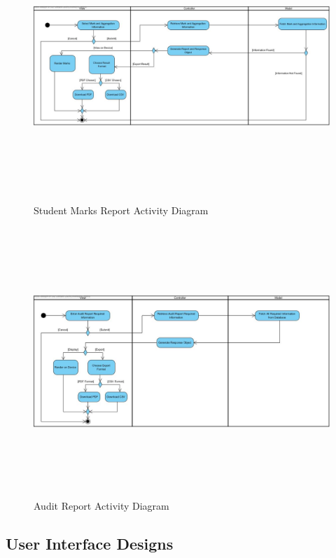 \documentclass[12pt]{article}
\begin{document}
						\begin{figure}[h]
										\centering
										\includegraphics[width=6in, height=4in]{Pictures/StudentMarksReport.jpg}
										\caption{Student Marks Report Activity Diagram}
						\end{figure}
						\FloatBarrier
						\begin{figure}[h]
										\centering
										\includegraphics[width=6in, height=4in]{Pictures/AuditReportActivityDiagram.jpg}
										\caption{Audit Report Activity Diagram}
						\end{figure}
				\vspace{0.2in}
		
		\subsection{User Interface Designs} %
				\vspace{0.2in}
		\newpage
\end{document}
